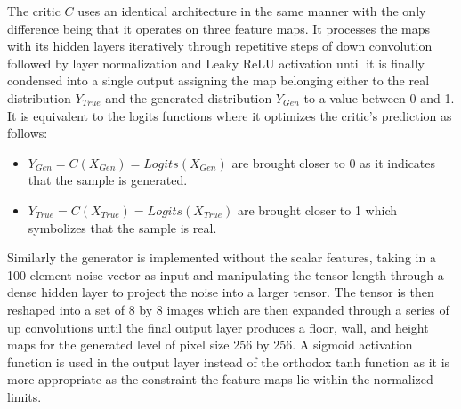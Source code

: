 \documentclass{Configuration_Files/PoliMi3i_thesis}
\begin{document}
The critic $C$ uses an identical architecture in the same manner with the only difference 
being that it operates on three feature maps. It processes the maps with its hidden 
layers iteratively through repetitive steps of down convolution followed by layer 
normalization and Leaky ReLU activation until it is finally condensed into a single 
output assigning the map belonging either to the real distribution $Y_{True}$ and the generated 
distribution $Y_{Gen}$ to a value between 0 and 1. It is equivalent to the logits functions 
where it optimizes the critic’s prediction as follows:
\begin{itemize}
\item $Y_{Gen} = C(X_{Gen}) = Logits(X_{Gen})$ are brought closer to 0 as it indicates that the
sample is generated.
\item $Y_{True} = C(X_{True}) = Logits(X_{True})$ are brought closer to 1 which symbolizes that the 
sample is real. 
\end{itemize}

Similarly the generator is implemented without the scalar features, taking in a 100-element noise 
vector as input and manipulating the tensor length through a dense hidden 
layer to project the noise into a larger tensor. The tensor is then reshaped into a set of 
8 by 8 images which are then expanded through a series of up convolutions until the 
final output layer produces a floor, wall, and height maps for the generated level of 
pixel size 256 by 256. A sigmoid activation function is used in the output layer instead of 
the orthodox tanh function as it is more appropriate as the constraint the feature 
maps lie within the normalized limits. 
\end{document}
